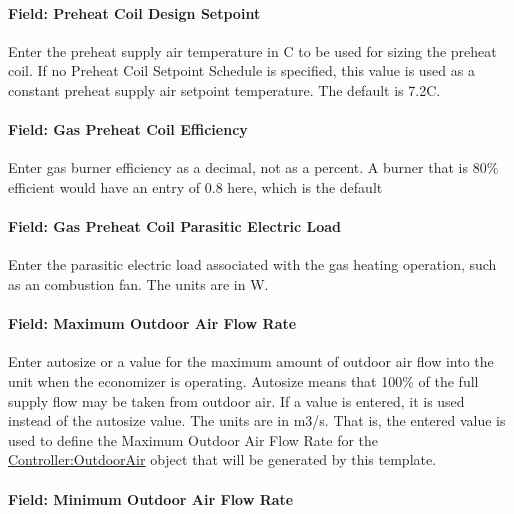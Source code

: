 \paragraph{Field: Preheat Coil Design Setpoint}\label{field-preheat-coil-design-setpoint}

Enter the preheat supply air temperature in C to be used for sizing the preheat coil. If no Preheat Coil Setpoint Schedule is specified, this value is used as a constant preheat supply air setpoint temperature. The default is 7.2C.

\paragraph{Field: Gas Preheat Coil Efficiency}\label{field-gas-preheat-coil-efficiency}

Enter gas burner efficiency as a decimal, not as a percent. A burner that is 80\% efficient would have an entry of 0.8 here, which is the default

\paragraph{Field: Gas Preheat Coil Parasitic Electric Load}\label{field-gas-preheat-coil-parasitic-electric-load}

Enter the parasitic electric load associated with the gas heating operation, such as an combustion fan. The units are in W.

\paragraph{Field: Maximum Outdoor Air Flow Rate}\label{field-maximum-outdoor-air-flow-rate-3}

Enter autosize or a value for the maximum amount of outdoor air flow into the unit when the economizer is operating. Autosize means that 100\% of the full supply flow may be taken from outdoor air. If a value is entered, it is used instead of the autosize value. The units are in m3/s. That is, the entered value is used to define the Maximum Outdoor Air Flow Rate for the \hyperref[controlleroutdoorair]{Controller:OutdoorAir} object that will be generated by this template.

\paragraph{Field: Minimum Outdoor Air Flow Rate}\label{field-minimum-outdoor-air-flow-rate-3}

